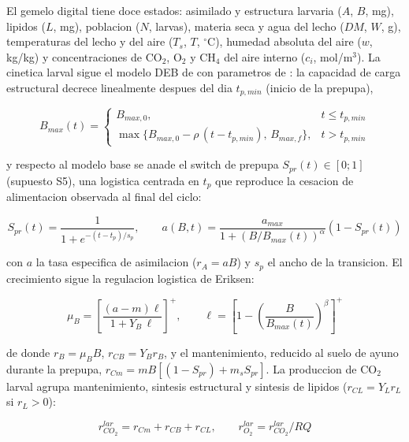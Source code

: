 El gemelo digital tiene doce estados: asimilado y estructura larvaria
($A$, $B$, mg), lipidos ($L$, mg), poblacion ($N$, larvas), materia seca y
agua del lecho ($DM$, $W$, g), temperaturas del lecho y del aire ($T_s$,
$T$, $^{\circ}$C), humedad absoluta del aire ($w$, kg/kg) y concentraciones
de CO$_2$, O$_2$ y CH$_4$ del aire interno ($c_i$, mol/m$^3$). La cinetica
larval sigue el modelo DEB de \textcite{eriksenDynamicModellingFeed2022}
con parametros de \parencite{eriksenMetabolicPerformanceFeed2024}: la
capacidad de carga estructural decrece linealmente despues del dia
$t_{p,min}$ (inicio de la prepupa),

\begin{equation}
  B_{max}(t) = \left\{ \begin{array}{ll} B_{max,0}, & t \leq t_{p,min} \\
  \max\{B_{max,0} - \rho\,(t - t_{p,min}),\, B_{max,f}\}, & t > t_{p,min}
  \end{array} \right.
\end{equation}

y respecto al modelo base se anade el switch de prepupa $S_{pr}(t) \in [0;1]$
(supuesto S5), una logistica centrada en $t_p$ que reproduce la cesacion
de alimentacion observada al final del ciclo:

\begin{equation}
  S_{pr}(t) = \frac{1}{1 + e^{-(t-t_p)/s_p}}, \qquad
  a(B,t) = \frac{a_{max}}{1 + (B/B_{max}(t))^{\alpha}} (1 - S_{pr}(t))
\end{equation}

con $a$ la tasa especifica de asimilacion ($r_A = aB$) y $s_p$ el ancho de
la transicion. El crecimiento sigue la regulacion logistica de Eriksen:

\begin{equation}
  \mu_B = \left[ \frac{(a - m)\ell}{1 + Y_B\,\ell} \right]^{+}, \qquad
  \ell = \left[ 1 - \left( \frac{B}{B_{max}(t)} \right)^{\beta} \right]^{+}
\end{equation}

de donde $r_B = \mu_B B$, $r_{CB} = Y_B r_B$, y el mantenimiento, reducido
al suelo de ayuno durante la prepupa, $r_{Cm} = mB[(1-S_{pr}) + m_s S_{pr}]$.
La produccion de CO$_2$ larval agrupa mantenimiento, sintesis estructural
y sintesis de lipidos ($r_{CL} = Y_L r_L$ si $r_L > 0$):

\begin{equation}
  r^{lar}_{CO_2} = r_{Cm} + r_{CB} + r_{CL}, \qquad
  r^{lar}_{O_2} = r^{lar}_{CO_2}/RQ
\end{equation}

